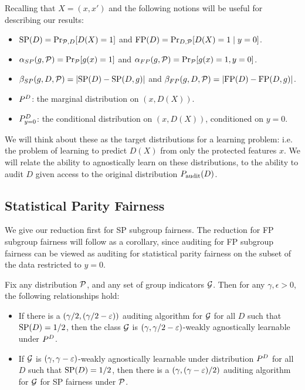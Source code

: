 Recalling that $X = (x,x')$ and the following notions will be useful
for describing our results:
\begin{itemize}
\item $\mathrm{SP}(D) = \Pr_{\mathcal{P}, D}[D(X) = 1]$ and
  $\mathrm{FP}(D) = \Pr_{D, \mathcal{P}} [D(X) = 1\mid y=0]$.
\item $\alpha_{SP}(g, \mathcal{P}) = \Pr_{\mathcal{P}}[g(x) = 1]$ and
  $\alpha_{FP}(g, \mathcal{P}) = \Pr_{\mathcal{P}}[g(x) = 1, y=0]$.
\item $\beta_{SP}(g, D, \mathcal{P}) = \left|\mathrm{SP}(D) - \mathrm{SP}(D, g)\right|$ and
  $\beta_{FP}(g, D, \mathcal{P}) = \left| \mathrm{FP}(D) - \mathrm{FP}(D, g) \right|$.

\item $P^D$: the marginal distribution on $(x, D(X))$.
\item $P_{y=0}^D$: the conditional distribution on $(x, D(X))$, conditioned on $y = 0$.
\end{itemize}
We will think about these as the target distributions for a learning problem: i.e. the problem of learning to predict $D(X)$ from only the protected features $x$. We will relate the ability to agnostically learn on these distributions, to the ability to audit $D$ given access to the original distribution $P_\mathrm{audit}(D)$.


\subsection{Statistical Parity Fairness}

We give our reduction first for SP subgroup fairness. The reduction
for FP subgroup fairness will follow as a corollary, since auditing
for FP subgroup fairness can be viewed as auditing for
statistical parity fairness on the subset of the data restricted to
$y = 0$.

\begin{theorem}\label{thm:reduction1}
  Fix any distribution $\mathcal{P}$, and any set of
  group indicators $\mathcal{G}$. 
Then for any
  $\gamma, \epsilon > 0$, the following relationships hold:
\begin{itemize}
\item If there is a $(\gamma/2, (\gamma/2 - \varepsilon))$ auditing algorithm
  for $\mathcal{G}$ for all $D$ such that $\mathrm{SP}(D) = 1/2$, then the class $\mathcal{G}$
  is $(\gamma, \gamma/2 - \varepsilon)$-weakly agnostically learnable under
  $P^D$.

\item If $\mathcal{G}$ is $(\gamma, \gamma - \varepsilon)$-weakly agnostically
  learnable under distribution $P^D$ for all $D$ such that
  $\mathrm{SP}(D) = 1/2$, then there is a $(\gamma, (\gamma - \varepsilon)/2)$
  auditing algorithm for $\mathcal{G}$ for SP fairness under $\mathcal{P}$.
\end{itemize}
\end{theorem}



